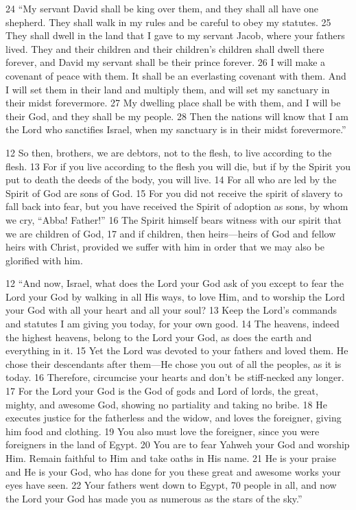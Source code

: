 \begin{bible}
24 ``My servant David shall be king over them, and they shall all have one shepherd. They shall walk in my rules and be careful to obey my statutes. 25 They shall dwell in the land that I gave to my servant Jacob, where your fathers lived. They and their children and their children's children shall dwell there forever, and David my servant shall be their prince forever. 26 I will make a covenant of peace with them. It shall be an everlasting covenant with them. And I will set them in their land and multiply them, and will set my sanctuary in their midst forevermore. 27 My dwelling place shall be with them, and I will be their God, and they shall be my people. 28 Then the nations will know that I am the Lord who sanctifies Israel, when my sanctuary is in their midst forevermore.'' 


12 So then, brothers, we are debtors, not to the flesh, to live according to the flesh. 13 For if you live according to the flesh you will die, but if by the Spirit you put to death the deeds of the body, you will live. 14 For all who are led by the Spirit of God are sons of God. 15 For you did not receive the spirit of slavery to fall back into fear, but you have received the Spirit of adoption as sons, by whom we cry, ``Abba! Father!'' 16 The Spirit himself bears witness with our spirit that we are children of God, 17 and if children, then heirs—heirs of God and fellow heirs with Christ, provided we suffer with him in order that we may also be glorified with him.


12 ``And now, Israel, what does the Lord your God ask of you except to fear the Lord your God by walking in all His ways, to love Him, and to worship the Lord your God with all your heart and all your soul?  13 Keep the Lord’s commands and statutes I am giving you today, for your own good.  14 The heavens, indeed the highest heavens, belong to the Lord your God, as does the earth and everything in it.  15 Yet the Lord was devoted to your fathers and loved them. He chose their descendants after them—He chose you out of all the peoples, as it is today.  16 Therefore, circumcise your hearts and don’t be stiff-necked any longer.  17 For the Lord your God is the God of gods and Lord of lords, the great, mighty, and awesome God, showing no partiality and taking no bribe.  18 He executes justice for the fatherless and the widow, and loves the foreigner, giving him food and clothing.  19 You also must love the foreigner, since you were foreigners in the land of Egypt.  20 You are to fear Yahweh your God and worship Him. Remain faithful to Him and take oaths in His name.  21 He is your praise and He is your God, who has done for you these great and awesome works your eyes have seen.  22 Your fathers went down to Egypt, 70 people in all, and now the Lord your God has made you as numerous as the stars of the sky.''


\end{bible}
